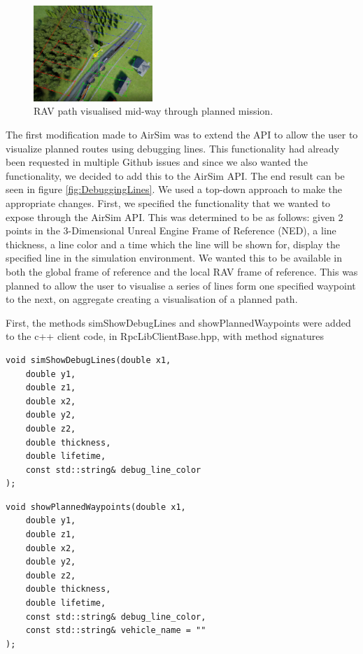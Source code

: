 \begin{figure}
    \centering
    \includegraphics[width=0.4\textwidth]{Chapters/SimulationEnv/Figs/DebuggingLines/RoutesWithRAVsVisible.png}
    \caption{RAV path visualised mid-way through planned mission.}
    \label{fig:DebuggingLinesPlannedMission}
\end{figure}
The first modification made to AirSim was to extend the API to allow the user to visualize planned routes using debugging lines. This functionality had already been requested in multiple Github issues  and since we also wanted the functionality, we decided to add this to the AirSim API. The end result can be seen in figure \ref{fig:DebuggingLines}. We used a top-down approach to make the appropriate changes. First, we specified the functionality that we wanted to expose through the AirSim API. This was determined to be as follows: given 2 points in the 3-Dimensional Unreal Engine Frame of Reference (NED), a line thickness, a line color and a time which the line will be shown for, display the specified line in the simulation environment. We wanted this to be available in both the global frame of reference and the local RAV frame of reference. This was planned to allow the user to visualise a series of lines form one specified waypoint to the next, on aggregate creating a visualisation of a planned path.
\newline


First, the methods simShowDebugLines and showPlannedWaypoints were added to the c++ client code, in RpcLibClientBase.hpp, with method signatures
\begin{verbatim}
void simShowDebugLines(double x1, 
    double y1,
    double z1,
    double x2,
    double y2,
    double z2,
    double thickness, 
    double lifetime,
    const std::string& debug_line_color
);
\end{verbatim}
\begin{verbatim}
void showPlannedWaypoints(double x1, 
    double y1, 
    double z1, 
    double x2, 
    double y2, 
    double z2, 
    double thickness, 
    double lifetime,
    const std::string& debug_line_color,
    const std::string& vehicle_name = ""
);
\end{verbatim}

